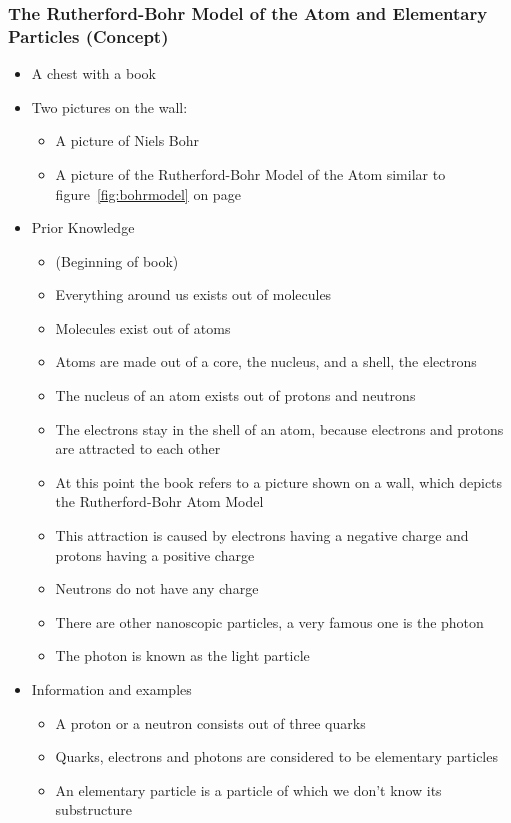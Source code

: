 \documentclass[11pt,twoside]{report} %
\begin{document}
\subsubsection{The Rutherford-Bohr Model of the Atom and Elementary Particles (Concept)}
	\begin{itemize}
		\item A chest with a book
		\item Two pictures on the wall:
		\begin{itemize}
			\item A picture of Niels Bohr
			\item A picture of the Rutherford-Bohr Model of the Atom similar to figure~\ref{fig:bohrmodel} on page~\pageref{fig:bohrmodel}
		\end{itemize}
		\item Prior Knowledge
		\begin{itemize}
			\item (Beginning of book)
			\item Everything around us exists out of molecules
			\item Molecules exist out of atoms
			\item Atoms are made out of a core, the nucleus, and a shell, the electrons
			\item The nucleus of an atom exists out of protons and neutrons
			\item The electrons stay in the shell of an atom, because electrons and protons are attracted to each other
			\item At this point the book refers to a picture shown on a wall, which depicts the Rutherford-Bohr Atom Model
			\item This attraction is caused by electrons having a negative charge and protons having a positive charge
			\item Neutrons do not have any charge
			\item There are other nanoscopic particles, a very famous one is the photon
			\item The photon is known as the light particle
		\end{itemize}
		\item Information and examples
		\begin{itemize}
			\item A proton or a neutron consists out of three quarks
			\item Quarks, electrons and photons are considered to be elementary particles
			\item An elementary particle is a particle of which we don’t know its substructure

\end{itemize}
\end{itemize}
\end{document}

